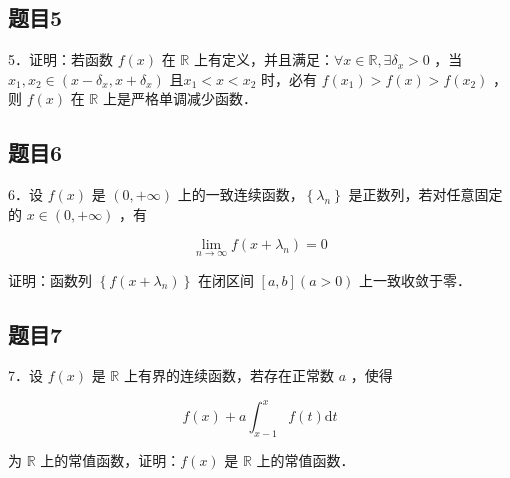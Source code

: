 \documentclass{article}
\begin{document}
\subsection{题目5}
5．证明：若函数 \(f(x)\) 在 \(\mathbb{R}\) 上有定义，并且满足：\(\forall x \in \mathbb{R}, \exists \delta_{x}>0\) ，当 \(x_{1}, x_{2} \in\left(x-\delta_{x}, x+\delta_{x}\right)\) 且\(x_{1}<x<x_{2}\) 时，必有 \(f\left(x_{1}\right)>f(x)>f\left(x_{2}\right)\) ，则 \(f(x)\) 在 \(\mathbb{R}\) 上是严格单调减少函数．

\subsection{题目6}
6．设 \(f(x)\) 是 \((0,+\infty)\) 上的一致连续函数，\(\left\{\lambda_{n}\right\}\) 是正数列，若对任意固定的 \(x \in(0,+\infty)\) ，有

\[
\lim _{n \rightarrow \infty} f\left(x+\lambda_{n}\right)=0
\]

证明：函数列 \(\left\{f\left(x+\lambda_{n}\right)\right\}\) 在闭区间 \([a, b](a>0)\) 上一致收敛于零．

\subsection{题目7}
7．设 \(f(x)\) 是 \(\mathbb{R}\) 上有界的连续函数，若存在正常数 \(a\) ，使得

\[
f(x)+a \int_{x-1}^{x} f(t) \mathrm{d} t
\]

为 \(\mathbb{R}\) 上的常值函数，证明：\(f(x)\) 是 \(\mathbb{R}\) 上的常值函数．
\end{document}
